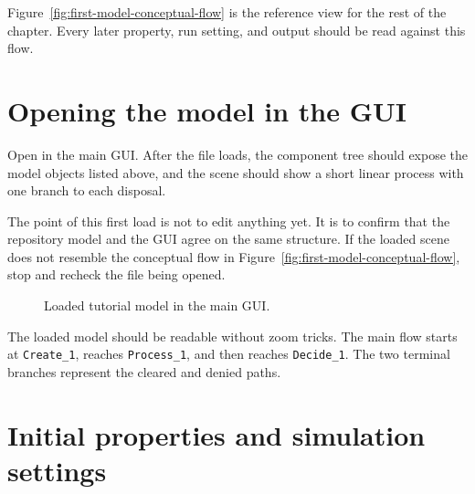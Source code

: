 Figure~\ref{fig:first-model-conceptual-flow} is the reference view for the rest
of the chapter. Every later property, run setting, and output should be read
against this flow.

\section{Opening the model in the GUI}
\label{sec:first-model-opening}

Open  in the main GUI. After the file
loads, the component tree should expose the model objects listed above, and the
scene should show a short linear process with one branch to each disposal.

The point of this first load is not to edit anything yet. It is to confirm that
the repository model and the GUI agree on the same structure. If the loaded
scene does not resemble the conceptual flow in
Figure~\ref{fig:first-model-conceptual-flow}, stop and recheck the file being
opened.

\begin{figure}[htbp]
\centering
\caption{Loaded tutorial model in the main GUI.}
\label{fig:first-model-gui-load}
\end{figure}

The loaded model should be readable without zoom tricks. The main flow starts at
\texttt{Create\_1}, reaches \texttt{Process\_1}, and then reaches
\texttt{Decide\_1}. The two terminal branches represent the cleared and denied
paths.

\section{Initial properties and simulation settings}
\label{sec:first-model-initial-properties}

